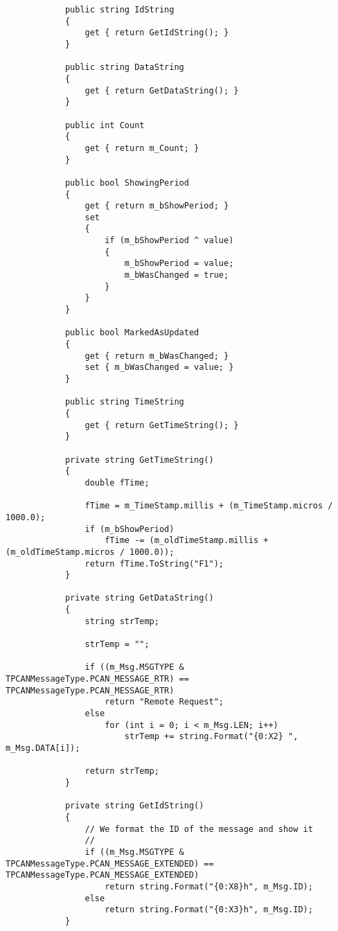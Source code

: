 \begin{lstlisting}
            public string IdString
            {
                get { return GetIdString(); }
            }

            public string DataString
            {
                get { return GetDataString(); }
            }

            public int Count
            {
                get { return m_Count; }
            }

            public bool ShowingPeriod
            {
                get { return m_bShowPeriod; }
                set
                {
                    if (m_bShowPeriod ^ value)
                    {
                        m_bShowPeriod = value;
                        m_bWasChanged = true;
                    }
                }
            }

            public bool MarkedAsUpdated
            {
                get { return m_bWasChanged; }
                set { m_bWasChanged = value; }
            }

            public string TimeString
            {
                get { return GetTimeString(); }
            }

            private string GetTimeString()
            {
                double fTime;

                fTime = m_TimeStamp.millis + (m_TimeStamp.micros / 1000.0);
                if (m_bShowPeriod)
                    fTime -= (m_oldTimeStamp.millis + (m_oldTimeStamp.micros / 1000.0));
                return fTime.ToString("F1");
            }

            private string GetDataString()
            {
                string strTemp;

                strTemp = "";

                if ((m_Msg.MSGTYPE & TPCANMessageType.PCAN_MESSAGE_RTR) == TPCANMessageType.PCAN_MESSAGE_RTR)
                    return "Remote Request";
                else
                    for (int i = 0; i < m_Msg.LEN; i++)
                        strTemp += string.Format("{0:X2} ", m_Msg.DATA[i]);

                return strTemp;
            }

            private string GetIdString()
            {
                // We format the ID of the message and show it
                //
                if ((m_Msg.MSGTYPE & TPCANMessageType.PCAN_MESSAGE_EXTENDED) == TPCANMessageType.PCAN_MESSAGE_EXTENDED)
                    return string.Format("{0:X8}h", m_Msg.ID);
                else
                    return string.Format("{0:X3}h", m_Msg.ID);
            }


\end{lstlisting}
